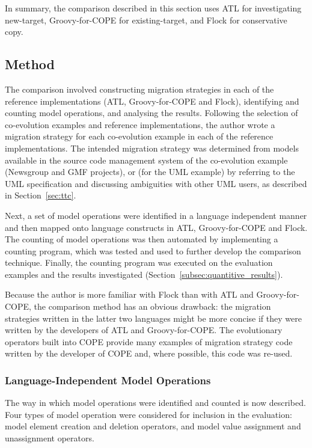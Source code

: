 In summary, the comparison described in this section uses ATL for investigating new-target, Groovy-for-COPE for existing-target, and Flock for conservative copy. 


\subsection{Method}
\label{subsec:quantitive_method}
The comparison involved constructing migration strategies in each of the reference implementations (ATL, Groovy-for-COPE and Flock), identifying and counting model operations, and analysing the results. Following the selection of co-evolution examples and reference implementations, the author wrote a migration strategy for each co-evolution example in each of the reference implementations. The intended migration strategy was determined from models available in the source code management system of the co-evolution example (Newsgroup and GMF projects), or (for the UML example) by referring to the UML specification and discussing ambiguities with other UML users, as described in Section~\ref{sec:ttc}.

Next, a set of model operations were identified in a language independent manner and then mapped onto language constructs in ATL, Groovy-for-COPE and Flock. The counting of model operations was then automated by implementing a counting program, which was tested and used to further develop the comparison technique. Finally, the counting program was executed on the evaluation examples and the results investigated (Section~\ref{subsec:quantitive_results}).

Because the author is more familiar with Flock than with ATL and Groovy-for-COPE, the comparison method has an obvious drawback: the migration strategies written in the latter two languages might be more concise if they were written by the developers of ATL and Groovy-for-COPE. The evolutionary operators built into COPE provide many examples of migration strategy code written by the developer of COPE and, where possible, this code was re-used.

\subsubsection{Language-Independent Model Operations}
\label{subsubsec:quantitive_model_operations}
The way in which model operations were identified and counted is now described. Four types of model operation were considered for inclusion in the evaluation: model element creation and deletion operators, and model value assignment and unassignment operators. 

